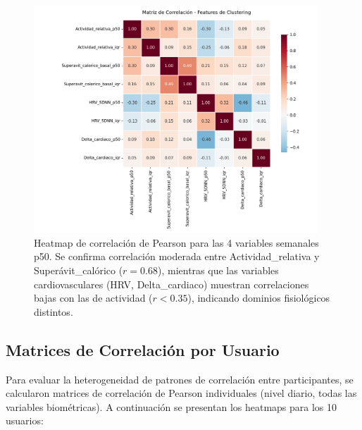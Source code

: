 \documentclass[12pt,letterpaper,twoside]{report}
\begin{document}
\begin{calculobox}
\begin{figure}[htbp]
\centering
\includegraphics[width=0.95\textwidth]{../analisis_u/semanal/precluster/features_correlacion_heatmap.png}
\caption{Heatmap de correlación de Pearson para las 4 variables semanales p50. Se confirma correlación moderada entre Actividad\_relativa y Superávit\_calórico ($r=0.68$), mientras que las variables cardiovasculares (HRV, Delta\_cardiaco) muestran correlaciones bajas con las de actividad ($r < 0.35$), indicando dominios fisiológicos distintos.}
\label{fig:features_correlacion_heatmap}
\end{figure}

\subsection{Matrices de Correlación por Usuario}

Para evaluar la heterogeneidad de patrones de correlación entre participantes, se calcularon matrices de correlación de Pearson individuales (nivel diario, todas las variables biométricas). A continuación se presentan los heatmaps para los 10 usuarios:


\end{calculobox}
\end{document}

